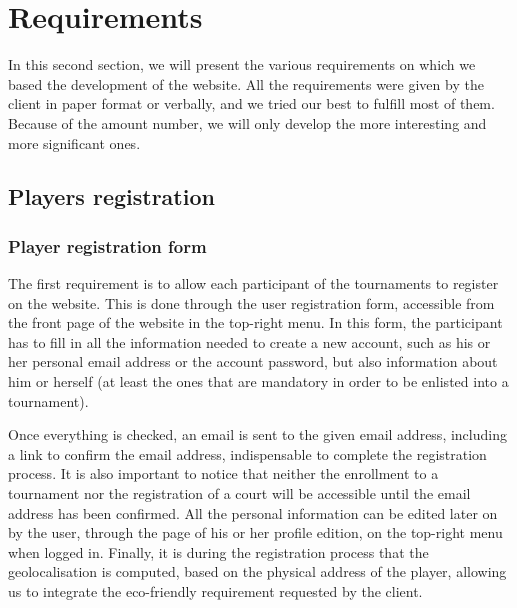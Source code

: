 \section{Requirements}
\label{sec:Requirements}


In this second section, we will present the various requirements on which we
based the development of the website. All the requirements were given by the
client in paper format or verbally, and we tried our best to fulfill most of
them. Because of the amount number, we will only develop the more interesting
and more significant ones.

\subsection{Players registration}
\label{sub:Players registration}

\subsubsection{Player registration form}
\label{subs:Registration form}


The first requirement is to allow each participant of the tournaments to
register on the website. This is done through the user registration form,
accessible from the front page of the website in the top-right menu.
In this form, the participant has to fill in all the information needed to
create a new account, such as his or her personal email address or the account
password, but also information about him or herself (at least the ones that
are mandatory in order to be enlisted into a tournament).
\bigskip

Once everything is checked, an email is sent to the given email address,
including a link to confirm the email address, indispensable to complete
the registration process. It is also important to notice that neither the
enrollment to a tournament nor the registration of a court will be accessible
until the email address has been confirmed. All the personal information can
be edited later on by the user, through the page of his or her profile edition,
on the top-right menu when logged in. Finally, it is during the registration
process that the geolocalisation is computed, based on the physical address
of the player, allowing us to integrate the eco-friendly requirement requested
by the client. \newline

